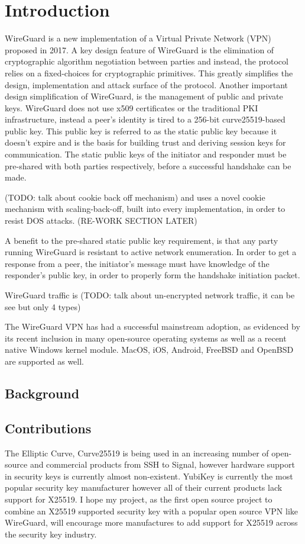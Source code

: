 \documentclass [11pt, proquest] {uwthesis}[2020/02/24]
\begin{document}
\textpages

\chapter {Introduction}
WireGuard is a new implementation of a Virtual Private Network (VPN) proposed in 2017. A key design feature of WireGuard is the elimination of cryptographic algorithm negotiation between parties and instead, the protocol relies on a fixed-choices for cryptographic primitives. This greatly simplifies the design, implementation and attack surface of the protocol. Another important design simplification of WireGuard, is the management of public and private keys. WireGuard does not use x509 certificates or the traditional PKI infrastructure, instead a peer's identity is tired to a 256-bit curve25519-based public key. This public key is referred to as the static public key because it doesn't expire and is the basis for building trust and deriving session keys for communication. The static public keys of the initiator and responder must be pre-shared with both parties respectively, before a successful handshake can be made. 

(TODO: talk about cookie back off mechanism) and uses a novel cookie mechanism with scaling-back-off, built into every implementation, in order to resist DOS attacks. (RE-WORK SECTION LATER)

A benefit to the pre-shared static public key requirement, is that any party running WireGuard is resistant to active network enumeration. In order to get a response from a peer, the initiator's message must have knowledge of the responder's public key, in order to properly form the handshake initiation packet. 

WireGuard traffic is (TODO: talk about un-encrypted network traffic, it can be see but only 4 types)

The WireGuard VPN has had a successful mainstream adoption, as evidenced by its recent inclusion in many 
open-source operating systems\cite{donenfeld_wireguard_nodate} as well as a recent native Windows kernel module\cite{noauthor_wireguard-nt_nodate}. MacOS, iOS, Android, FreeBSD and OpenBSD are supported as well.



\section {Background}


\section {Contributions}
The Elliptic Curve, Curve25519 is being used in an increasing number of open-source and commercial products\cite{noauthor_things_nodate-1} from SSH to Signal, however hardware support in 
security keys is currently almost non-existent. YubiKey is currently the most popular security key manufacturer however all of their current products 
lack support for X25519. I hope my project, as the first open source project to combine an X25519 supported security key with a popular open source VPN like WireGuard, will encourage more manufactures to add support for X25519 across the security key industry.
\end{document}
